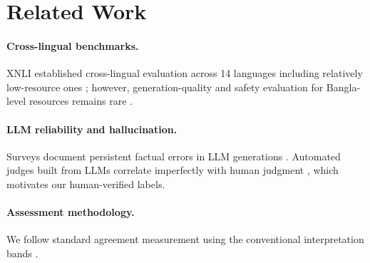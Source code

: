 \section{Related Work}
\label{sec:related}

\paragraph{Cross-lingual benchmarks.} XNLI established cross-lingual
evaluation across 14 languages including relatively low-resource ones
\citep{conneau2018xnli}; however, generation-quality and safety evaluation for
Bangla-level resources remains rare .

\paragraph{LLM reliability and hallucination.} Surveys document persistent
factual errors in LLM generations \citep{ji2023survey}. Automated judges built
from LLMs correlate imperfectly with human judgment \citep{zheng2023judging},
which motivates our human-verified labels.

\paragraph{Assessment methodology.} We follow standard agreement measurement
\citep{cohen1960coefficient,fleiss1971measuring,krippendorff2018content} using
the conventional interpretation bands \citep{landis1977measurement}.

